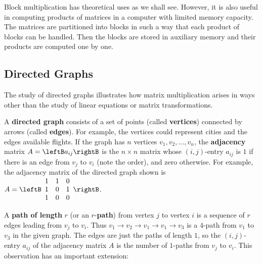Block multiplication has theoretical uses as we shall see. However, it is also useful in computing products of matrices in a computer with limited memory capacity. The matrices are partitioned into blocks in such a way that each product of blocks can be handled. Then the blocks are stored in auxiliary memory and their products are computed one by one.


\subsection*{Directed Graphs}


The study of directed graphs illustrates how matrix multiplication arises in ways other than the study of linear equations or matrix transformations.

A \textbf{directed graph} consists of a set of points (called \textbf{vertices}) connected by arrows (called \textbf{edges}). For example, the vertices could represent cities and the edges available flights. If the graph has $n$ vertices $v_{1}, v_{2}, \dots, v_{n}$, the \textbf{adjacency} matrix $A = \leftB a_{ij} \rightB$ is the $n \times n$ matrix whose $(i, j)$-entry $a_{ij}$ is $1$ if there is an edge from $v_{j}$ to $v_{i}$ (note the order), and zero otherwise. For example, the adjacency matrix of the directed graph shown is $A = \leftB \begin{array}{rrr}
1 & 1 & 0 \\
1 & 0 & 1 \\
1 & 0 & 0
\end{array} \rightB$. 

\begin{wrapfigure}[5]{l}{5cm} 
\centering

\end{wrapfigure}

\noindent A \textbf{path of length} $r$ (or an $r$-\textbf{path}) from vertex $j$ to vertex $i$ is a sequence of $r$ edges leading from $v_{j}$ to $v_{i}$. Thus $v_{1} \to v_{2} \to v_{1} \to v_{1} \to v_{3}$ is a $4$-path from $v_{1}$ to $v_{3}$ in the given graph. The edges are just the paths of length $1$, so the $(i, j)$-entry $a_{ij}$ of the adjacency matrix $A$ is the number of $1$-paths from $v_{j}$ to $v_{i}$. This observation has an important extension:


